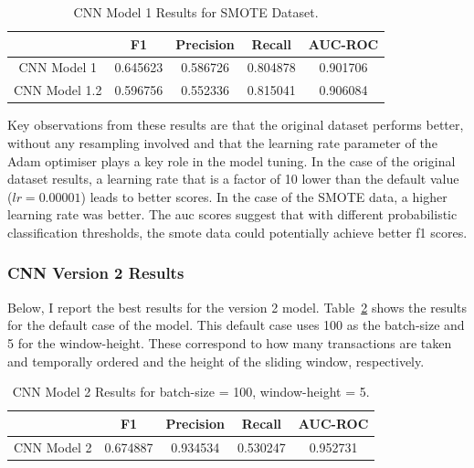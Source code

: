 \documentclass[12pt,a4paper,twoside]{report}
\begin{document}
\begin{table}[H]  
  \centering
  \begin{tabular}{ccccc}
    \toprule
           		& F1 & Precision & Recall & AUC-ROC\\ \midrule
    CNN Model 1 & 0.645623 &  0.586726 & 0.804878 & 0.901706 \\
    CNN Model 1.2 &  0.596756  & 0.552336 & 0.815041 & 0.906084\\
   \bottomrule
 \end{tabular}
 \caption{CNN Model 1 Results for SMOTE Dataset.}
\label{table:cnnv1-results-smote}
\end{table}

Key observations from these results are that the original dataset performs better, without any resampling involved and that the learning rate parameter of the Adam optimiser plays a key role in the model tuning. In the case of the original dataset results, a learning rate that is a factor of 10 lower than the default value ($lr = 0.00001$) leads to better scores. In the case of the SMOTE data, a higher learning rate was better. The auc scores suggest that with different probabilistic classification thresholds, the smote data could potentially achieve better f1 scores. 

\subsubsection{CNN Version 2 Results}

Below, I report the best results for the version 2 model. Table~\ref{table:cnnv2-results-original} shows the results for the default case of the model. This default case uses 100 as the batch-size and 5 for the window-height. These correspond to how many transactions are taken and temporally ordered and the height of the sliding window, respectively. 

\begin{table}[H]  
  \centering
  \begin{tabular}{ccccc}
    \toprule
           		& F1 & Precision & Recall & AUC-ROC \\ \midrule
    CNN Model 2 & 0.674887 & 0.934534 & 0.530247 & 0.952731  \\
 
   \bottomrule
 \end{tabular}
 \caption{CNN Model 2 Results for batch-size = 100, window-height = 5.}
\label{table:cnnv2-results-original}
\end{table}
\end{document}
